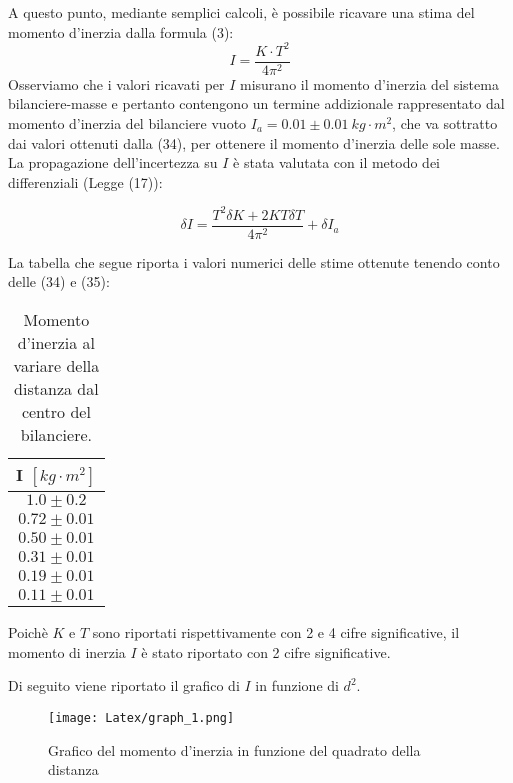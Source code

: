 A questo punto, mediante semplici calcoli, è possibile ricavare una stima del momento d'inerzia dalla formula (3):
\begin{equation}
    I = \frac{K \cdot T^2}{4\pi^2}
\end{equation} 
Osserviamo che i valori ricavati per $I$ misurano il momento d'inerzia del sistema bilanciere-masse e pertanto contengono un termine addizionale rappresentato dal momento d'inerzia del bilanciere vuoto $I_a = 0.01 \pm 0.01 \ kg \cdot m^2$, che va sottratto dai valori ottenuti dalla (34), per ottenere il momento d'inerzia delle sole masse. La propagazione dell'incertezza su $I$ è stata valutata con il metodo dei differenziali (Legge (17)):

\begin{equation}
    \delta I = \frac{T^2 \delta K + 2 KT \delta T}{4\pi^2} + \delta I_a
\end{equation}

La tabella che segue riporta i valori numerici delle stime ottenute tenendo conto delle (34) e (35):

\begin{table}[H]
	\centering
	\begin{tabular}{|c|}
		\hline
		\textbf{I $[kg \cdot m^2]$} \\
		\hline
		$1.0\pm 0.2$ \\
		$0.72\pm 0.01$ \\
		$0.50\pm 0.01$ \\
		$0.31\pm 0.01$ \\
		$0.19\pm 0.01$ \\
            $0.11 \pm 0.01$ \\
		\hline
	\end{tabular}
	\caption{Momento d'inerzia al variare della distanza dal centro del bilanciere.}
	\label{tab:}
\end{table}

Poichè $K$ e $T$ sono riportati rispettivamente con 2 e 4 cifre significative, il momento di inerzia $I$ è stato riportato con 2 cifre significative.

Di seguito viene riportato il grafico di $I$ in funzione di $d^2$.

\begin{figure}[h]
    \centering
    \texttt{[image: Latex/graph\_1.png]}
    \caption{Grafico del momento d'inerzia in funzione del quadrato della distanza}
    \label{fig:etichetta}
\end{figure}

